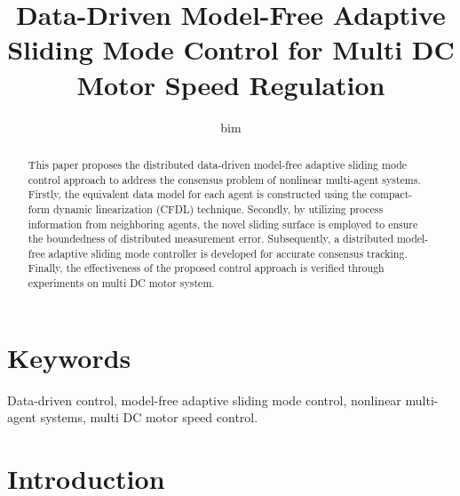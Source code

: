 \documentclass[journal,onecolumn]{IEEEtran}
\title{\LARGE Data-Driven Model-Free Adaptive Sliding Mode Control for Multi DC Motor Speed Regulation}
\author{bim}
\begin{document}
\maketitle

\begin{abstract}
    This paper proposes the distributed data-driven model-free adaptive sliding mode control approach to address the consensus problem of nonlinear multi-agent systems. Firstly, the equivalent data model for each agent is constructed using the compact-form dynamic linearization (CFDL) technique. Secondly, by utilizing process information from neighboring agents, the novel sliding surface is employed to ensure the boundedness of distributed measurement error. Subsequently, a distributed model-free adaptive sliding mode controller is developed for accurate consensus tracking. Finally, the effectiveness of the proposed control approach is verified through experiments on multi DC motor system.
\end{abstract}


\section*{Keywords}
Data-driven control, model-free adaptive sliding mode control, nonlinear multi-agent systems, multi DC motor speed control.

\section{Introduction}\label{section:1}


\end{document}
